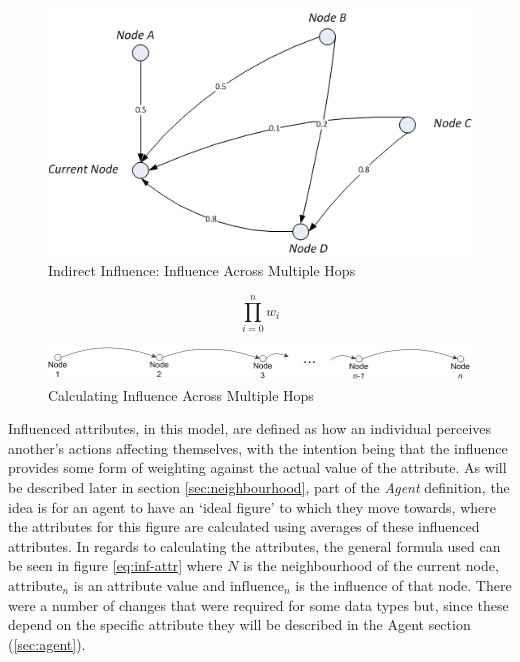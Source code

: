 \documentclass[]{report}
\begin{document}
\begin{figure}
\label{img:multihop-inf}
\begin{center}
\includegraphics[scale=0.75]{multi-inf.png}
\end{center}
\caption{Indirect Influence: Influence Across Multiple Hops}
\end{figure}

\begin{equation}
\label{eq:multihop-inf}
\prod_{i=0}^{n}w_{i}
\end{equation}

\begin{figure}
\label{img:multihop-inf-calc}
\begin{center}
\includegraphics[scale=0.75]{multihop-inf.png}
\end{center}
\caption{Calculating Influence Across Multiple Hops}
\end{figure}
Influenced attributes, in this model, are defined as how an individual perceives another's actions affecting themselves, with the intention being that the influence provides some form of weighting against the actual value of the attribute. As will be described later in section \ref{sec:neighbourhood}, part of the \emph{Agent} definition, the idea is for an agent to have an `ideal figure' to which they move towards, where the attributes for this figure are calculated using averages of these influenced attributes. In regards to calculating the attributes, the general formula used can be seen in figure \ref{eq:inf-attr} where $N$ is the neighbourhood of the current node, $\text{attribute}_{n}$ is an attribute value and $\text{influence}_{n}$ is the influence of that node. There were a number of changes that were required for some data types but, since these depend on the specific attribute they will be described in the Agent section (\ref{sec:agent}).
\end{document}
